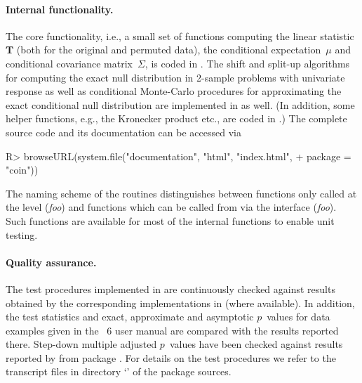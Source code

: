 \documentclass[article]{jss}
\newcommand{\T}{\mathbf{T}}
\begin{document}
\paragraph{Internal functionality.}

The core functionality, i.e., a small set of 
functions computing the linear statistic $\T$ (both for the original and
permuted data), the conditional expectation~$\mu$
and conditional covariance matrix~$\Sigma$, is coded in . 
The shift and split-up algorithms \citep{axact-dist:1986,exakte-ver:1987,vdWiel2001}
for computing the exact null distribution in 2-sample problems with univariate response
as well as conditional Monte-Carlo procedures for approximating the
exact conditional null distribution are implemented in  as well.
(In addition,
some helper functions, e.g., the Kronecker product etc., are coded in .)
The complete  source code and its documentation can be accessed via
\begin{Schunk}
\begin{Sinput}
R> browseURL(system.file("documentation", "html", "index.html",
+    package = "coin"))
\end{Sinput}
\end{Schunk}
The naming scheme of the  routines distinguishes between functions
only called at the  level (\textit{foo}) and functions which can 
be called from  via the  interface (\textit{foo}). 
Such functions are available for most of the internal  functions to enable
unit testing.


\paragraph{Quality assurance.}

The test procedures implemented in  are continuously
checked against results obtained by the corresponding implementations in
 (where available). In addition, the test statistics
and exact, approximate and asymptotic $p$~values for data examples
given in the ~6 user manual \citep{StatXact6} are compared
with the results reported there. Step-down multiple adjusted $p$~values
have been checked against results reported by  from
package  \citep{PKG:multtest}. For details on the test
procedures we refer to the  transcript files in directory
`' of the  package sources.
\end{document}

